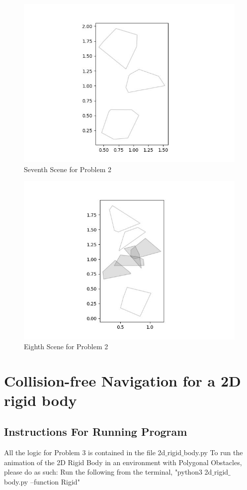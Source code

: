 \documentclass{article}
\begin{document}
\begin{figure}[h!]
	\includegraphics[width= 0.9 \linewidth]{Problem2_scene7.jpg}
	\centering
	\caption{Seventh Scene for Problem 2}
	\label{Problem2_scene7.jpg}
\end{figure}

\begin{figure}[h!]
	\includegraphics[width= 0.9 \linewidth]{Problem2_scene8.jpg}
	\centering
	\caption{Eighth Scene for Problem 2}
	\label{Problem2_scene8.jpg}
\end{figure}


 \newpage 
\section{Collision-free Navigation for a 2D rigid body}
\subsection{Instructions For Running Program}
All the logic for Problem 3 is contained in the file 2d$\_$rigid$\_$body.py \newline 
To run the animation of the 2D Rigid Body in an environment with Polygonal Obstacles, please do as such: \newline
Run the following from the terminal, "python3 2d$\_$rigid$\_$body.py --function Rigid" \newline 
\end{document}

